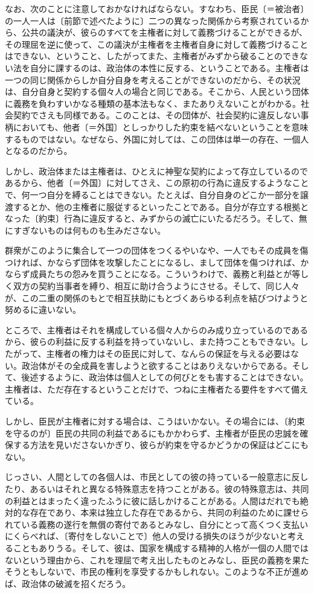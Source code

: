 なお、次のことに注意しておかなければならない。すなわち、臣民〔＝被治者〕の一人一人は〔前節で述べたように〕二つの異なった関係から考察されているから、公共の議決が、彼らのすべてを主権者に対して義務づけることができるが、その理屈を逆に使って、この議決が主権者を主権者自身に対して義務づけることはできない、ということ、したがってまた、主権者がみずから破ることのできない法を自分に課するのは、政治体の本性に反する、ということである。主権者は一つの同じ関係からしか自分自身を考えることができないのだから、その状況は、自分自身と契約する個々人の場合と同じである。そこから、人民という団体に義務を負わすいかなる種類の基本法もなく、またありえないことがわかる。社会契約でさえも同様である。このことは、その団体が、社会契約に違反しない事柄においても、他者〔＝外国〕としっかりした約束を結べないということを意味するものではない。なぜなら、外国に対しては、この団体は単一の存在、一個人となるのだから。

しかし、政治体または主権者は、ひとえに神聖な契約によって存立しているのであるから、他者〔＝外国〕に対してさえ、この原初の行為に違反するようなことで、何一つ自分を縛ることはできない。たとえば、自分自身のどこか一部分を譲渡するとか、他の主権者に服従するといったことである。自分が存立する根拠となった〔約束〕行為に違反すると、みずからの滅亡にいたるだろう。そして、無にすぎないものは何ものも生みださない。

群衆がこのように集合して一つの団体をつくるやいなや、一人でもその成員を傷つければ、かならず団体を攻撃したことになるし、まして団体を傷つければ、かならず成員たちの怨みを買うことになる。こういうわけで、義務と利益とが等しく双方の契約当事者を縛り、相互に助け合うようにさせる。そして、同じ人々が、この二重の関係のもとで相互扶助にもとづくあらゆる利点を結びつけようと努めるに違いない。

ところで、主権者はそれを構成している個々人からのみ成り立っているのであるから、彼らの利益に反する利益を持っていないし、また持つこともできない。したがって、主権者の権力はその臣民に対して、なんらの保証を与える必要はない。政治体がその全成員を害しようと欲することはありえないからである。そして、後述するように、政治体は個人としての何びとをも害することはできない。主権者は、ただ存在するということだけで、つねに主権者たる要件をすべて備えている。

しかし、臣民が主権者に対する場合は、こうはいかない。その場合には、〔約束を守るのが〕臣民の共同の利益であるにもかかわらず、主権者が臣民の忠誠を確保する方法を見いださないかぎり、彼らが約束を守るかどうかの保証はどこにもない。

じっさい、人間としての各個人は、市民としての彼の持っている一般意志に反したり、あるいはそれと異なる特殊意志を持つことがある。彼の特殊意志は、共同の利益とはまったく違ったふうに彼に話しかけることがある。人間はだれでも絶対的な存在であり、本来は独立した存在であるから、共同の利益のために課せられている義務の遂行を無償の寄付であるとみなし、自分にとって高くつく支払いにくらべれば、〔寄付をしないことで〕他人の受ける損失のほうが少ないと考えることもありうる。そして、彼は、国家を構成する精神的人格が一個の人間ではないという理由から、これを理屈で考え出したものとみなし、臣民の義務を果たそうともしないで、市民の権利を享受するかもしれない。このような不正が進めば、政治体の破滅を招くだろう。

